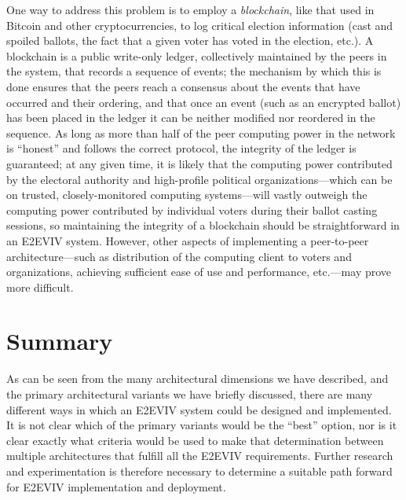 One way to address this problem is to employ a \emph{blockchain}, like
that used in Bitcoin and other cryptocurrencies, to log critical
election information (cast and spoiled ballots, the fact that a given
voter has voted in the election, etc.). A blockchain is a public
write-only ledger, collectively maintained by the peers in the system,
that records a sequence of events; the mechanism by which this is done
ensures that the peers reach a consensus about the events that have
occurred and their ordering, and that once an event (such as an
encrypted ballot) has been placed in the ledger it can be neither
modified nor reordered in the sequence. As long as more than half of
the peer computing power in the network is ``honest'' and follows the
correct protocol, the integrity of the ledger is guaranteed; at any
given time, it is likely that the computing power contributed by the
electoral authority and high-profile political organizations---which
can be on trusted, closely-monitored computing systems---will vastly
outweigh the computing power contributed by individual voters during
their ballot casting sessions, so maintaining the integrity of a
blockchain should be straightforward in an E2EVIV system. However,
other aspects of implementing a peer-to-peer architecture---such as
distribution of the computing client to voters and organizations,
achieving sufficient ease of use and performance, etc.---may prove
more difficult. 

\section{Summary}

As can be seen from the many architectural dimensions we have
described, and the primary architectural variants we have briefly
discussed, there are many different ways in which an E2EVIV system
could be designed and implemented. It is not clear which of the
primary variants would be the ``best'' option, nor is it clear exactly
what criteria would be used to make that determination between
multiple architectures that fulfill all the E2EVIV
requirements. Further research and experimentation is therefore
necessary to determine a suitable path forward for E2EVIV
implementation and deployment.
